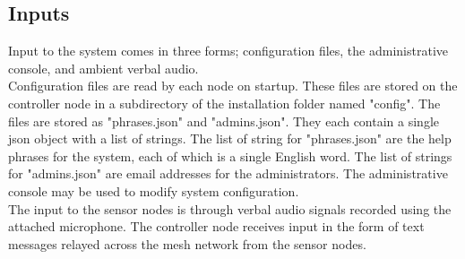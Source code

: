 \documentclass[11pt,a4paper]{article}
\begin{document}
\subsection{Inputs}
Input to the system comes in three forms; configuration files, the administrative console, and ambient verbal audio. \\
Configuration files are read by each node on startup. These files are stored on the controller node in a subdirectory of the installation folder named "config".  The files are stored as "phrases.json" and "admins.json". They each contain a single json object with a list of strings. The list of string for "phrases.json" are the help phrases for the system, each of which is a single English word. The list of strings for "admins.json" are email addresses for the administrators.
The administrative console may be used to modify system configuration. 
\\
The input to the sensor nodes is through verbal audio signals recorded using the attached microphone.  The controller node receives input in the form of text messages relayed across the mesh network from the sensor nodes.
\end{document}
